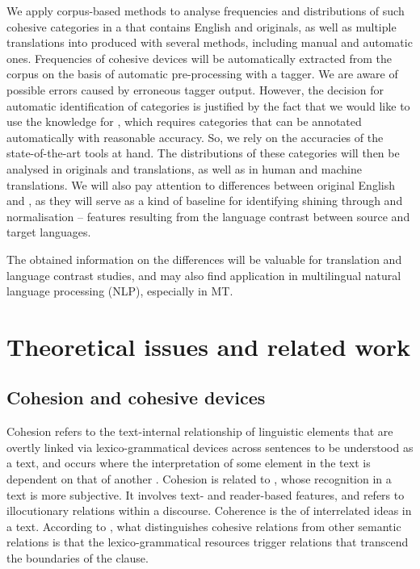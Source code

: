 \documentclass[output=paper]{langsci/langscibook.cls}
\begin{document}
We apply corpus-based methods to analyse frequencies and distributions of such cohesive categories in a  that contains English and  originals, as well as multiple translations into  produced with se\-ve\-ral methods, including manual and automatic ones. Frequencies of cohesive devices will be automatically extracted from the corpus on the basis of automatic pre-processing with a  tagger. We are aware of possible errors caused by erroneous tagger output. However, the decision for automatic identification of categories is justified by the fact that we would like to use the knowledge for , which requires categories that can be annotated automatically with reasonable accuracy. So, we rely on the accuracies of the state-of-the-art tools at hand. %
The distributions of these categories will then be analysed in originals and translations, as well as in human and machine translations. We will also pay attention to differences between original English and , as they will serve as a kind of baseline for identifying {\sc shining through} and {\sc normalisation} --  features resulting from the language contrast between source and target languages.

The obtained information on the differences will be valuable for translation and language contrast studies, and may also find application in multilingual natural language processing (NLP), especially in MT. 


\section{Theoretical issues and related work}\label{sec:theory}

\subsection{Cohesion and cohesive devices}\label{sec:cohesion}

{\sc Cohesion} refers to the text-internal relationship of linguistic elements that are overtly linked via lexico-grammatical devices across sentences to be understood as a text, and occurs where the interpretation of some element in the text is dependent on that of another \citep{HallidayHasan1976}. Cohesion is related to , whose recognition in a text is more subjective. It involves text- and reader-based features, and refers to illocutionary relations within a discourse. Coherence is the  of interrelated ideas in a text. According to \citet{HallidayHasan1976}, what distinguishes cohesive relations from other semantic relations is that the lexico-grammatical resources trigger relations that transcend the boundaries of the clause.
\end{document}
